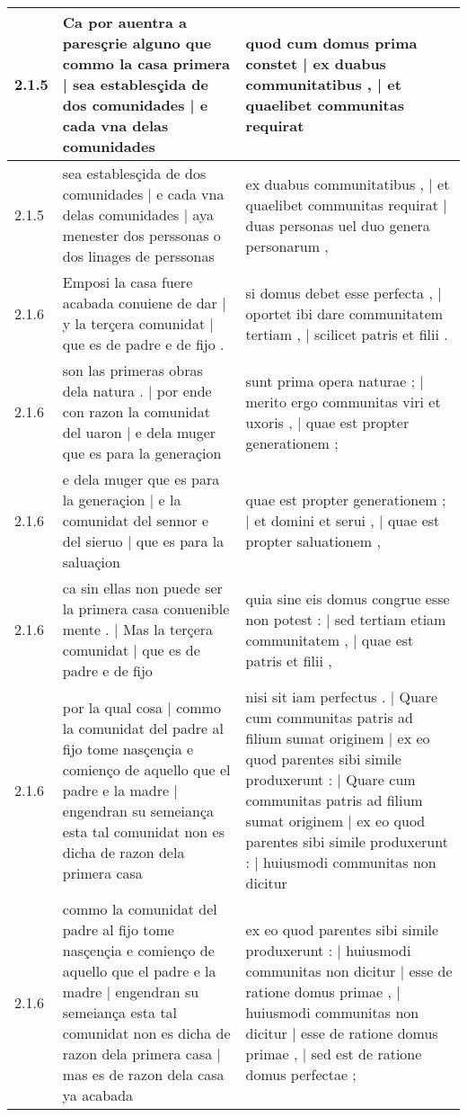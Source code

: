 \begin{tabular}{|p{1cm}|p{6.5cm}|p{6.5cm}|}
2.1.5 & Ca por auentra a paresçrie alguno que commo la casa primera | sea establesçida de dos comunidades | e cada vna delas comunidades & quod cum domus prima constet | ex duabus communitatibus , | et quaelibet communitas requirat \\\hline
2.1.5 & sea establesçida de dos comunidades | e cada vna delas comunidades | aya menester dos perssonas o dos linages de perssonas & ex duabus communitatibus , | et quaelibet communitas requirat | duas personas uel duo genera personarum , \\\hline
2.1.6 & Emposi la casa fuere acabada conuiene de dar | y la terçera comunidat | que es de padre e de fijo . & si domus debet esse perfecta , | oportet ibi dare communitatem tertiam , | scilicet patris et filii . \\\hline
2.1.6 & son las primeras obras dela natura . | por ende con razon la comunidat del uaron | e dela muger que es para la generaçion & sunt prima opera naturae ; | merito ergo communitas viri et uxoris , | quae est propter generationem ; \\\hline
2.1.6 & e dela muger que es para la generaçion | e la comunidat del sennor e del sieruo | que es para la saluaçion & quae est propter generationem ; | et domini et serui , | quae est propter saluationem , \\\hline
2.1.6 & ca sin ellas non puede ser la primera casa conuenible mente . | Mas la terçera comunidat | que es de padre e de fijo & quia sine eis domus congrue esse non potest : | sed tertiam etiam communitatem , | quae est patris et filii , \\\hline
2.1.6 & por la qual cosa | commo la comunidat del padre al fijo tome nasçençia e comienço de aquello que el padre e la madre | engendran su semeiança esta tal comunidat non es dicha de razon dela primera casa & nisi sit iam perfectus . | Quare cum communitas patris ad filium sumat originem | ex eo quod parentes sibi simile produxerunt : | Quare cum communitas patris ad filium sumat originem | ex eo quod parentes sibi simile produxerunt : | huiusmodi communitas non dicitur \\\hline
2.1.6 & commo la comunidat del padre al fijo tome nasçençia e comienço de aquello que el padre e la madre | engendran su semeiança esta tal comunidat non es dicha de razon dela primera casa | mas es de razon dela casa ya acabada & ex eo quod parentes sibi simile produxerunt : | huiusmodi communitas non dicitur | esse de ratione domus primae , | huiusmodi communitas non dicitur | esse de ratione domus primae , | sed est de ratione domus perfectae ; \\\hline

\end{tabular}
